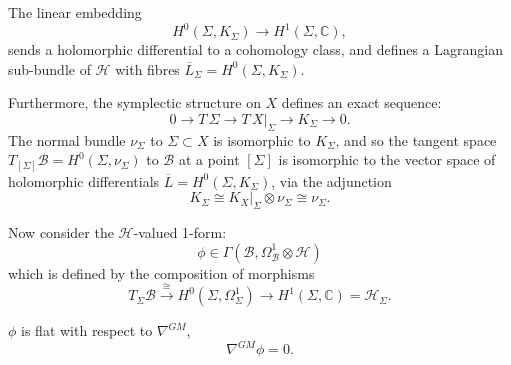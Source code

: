     The linear embedding 
    \[ H^0(\Sigma,K_\Sigma)\rightarrow  H^1(\Sigma, \mathbb{C}),\] 
    sends a holomorphic differential to a cohomology class, and defines a Lagrangian sub-bundle of \( \mathcal{H}\) with fibres \(\overline{L}_\Sigma = H^0(\Sigma,K_\Sigma)\).  
    
    Furthermore, the symplectic structure on \(X\) defines an exact sequence:
    \begin{equation}              
        \label{eqn:ext}
        0 \rightarrow T \, \Sigma \rightarrow T\, X|_\Sigma \rightarrow K_\Sigma \rightarrow 0.
    \end{equation}
    The normal bundle \(\nu_\Sigma\) to \(\Sigma\subset X\) is isomorphic to \(K_\Sigma\),
    and so the tangent space \(T_{[\Sigma]} \mathcal{B} = H^0(\Sigma,\nu_\Sigma)\) to \(\mathcal{B}\) at a point \([\Sigma]\) is isomorphic to the vector space of holomorphic differentials \(\overline{L} = H^0(\Sigma,K_\Sigma)\), via the adjunction 
    \[ K_\Sigma\cong K_X|_\Sigma\otimes\nu_\Sigma\cong \nu_\Sigma.\]
    
    
    Now consider the \( \mathcal{H}\)-valued 1-form: 
    \begin{equation} \label{eqn:phi} \phi \in \Gamma(\mathcal{B},\Omega^1_{\mathcal{B}}\otimes \mathcal{H} )
    \end{equation} 
    which is defined by the composition of morphisms
    \[ T_\Sigma \mathcal{B} \stackrel{\cong}{\longrightarrow} H^0(\Sigma,\Omega^1_\Sigma) \rightarrow H^1(\Sigma, \mathbb{C}) =\mathcal{H}_\Sigma. \]
    \begin{lem} \(\phi\) is flat with respect to \(\nabla^{GM}\),
    \[ \nabla^{GM} \phi = 0. \]
    \end{lem} 

